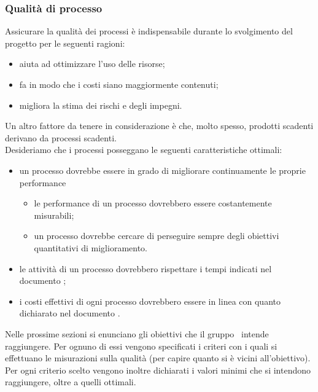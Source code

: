 \documentclass[../PianoDiQualifica.tex]{subfiles}
\begin{document}
		\subsubsection{Qualità di processo}
		Assicurare la qualità dei processi è indispensabile durante lo svolgimento del progetto per le seguenti ragioni:
		\begin{itemize}
		\item aiuta ad ottimizzare l'uso delle risorse;
		\item fa in modo che i costi siano maggiormente contenuti;
		\item migliora la stima dei rischi e degli impegni.
		\end{itemize}
		Un altro fattore da tenere in considerazione è che, molto spesso, prodotti scadenti derivano da processi scadenti.\\
		Desideriamo che i processi posseggano le seguenti caratteristiche ottimali:
		\begin{itemize}
			\item un processo dovrebbe essere in grado di migliorare continuamente le proprie performance
			\begin{itemize}
				\item le performance di un processo dovrebbero essere costantemente misurabili;
				\item un processo dovrebbe cercare di perseguire sempre degli obiettivi quantitativi di miglioramento.
			\end{itemize}
			\item le attività di un processo dovrebbero rispettare i tempi indicati nel documento \pianodiprogettov;
			\item i costi effettivi di ogni processo dovrebbero essere in linea con quanto dichiarato nel documento \pianodiprogettov.
		\end{itemize}
		Nelle prossime sezioni si enunciano gli obiettivi che il gruppo \leaf\ intende raggiungere. Per ognuno di essi vengono specificati i criteri con i quali si effettuano le misurazioni sulla qualità (per capire quanto si è vicini all’obiettivo).\\
		Per ogni criterio scelto vengono inoltre dichiarati i valori minimi che si intendono raggiungere, oltre a quelli ottimali.
			
\end{document}
